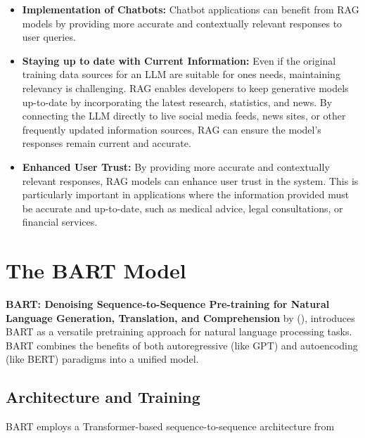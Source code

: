 \begin{itemize}
    \item \textbf{Implementation of Chatbots:} Chatbot applications can benefit from RAG models by providing more accurate and contextually relevant responses to user queries. 
    \item \textbf{Staying up to date with Current Information:} Even if the original training data sources for an LLM are suitable for ones needs, maintaining relevancy is challenging. RAG enables developers to keep generative models up-to-date by incorporating the latest research, statistics, and news. By connecting the LLM directly to live social media feeds, news sites, or other frequently updated information sources, RAG can ensure the model's responses remain current and accurate.
    \item \textbf{Enhanced User Trust:} By providing more accurate and contextually relevant responses, RAG models can enhance user trust in the system. This is particularly important in applications where the information provided must be accurate and up-to-date, such as medical advice, legal consultations, or financial services.
\end{itemize}

\section{The BART Model}\label{sec:bart}
    \textbf{BART: Denoising Sequence-to-Sequence Pre-training for Natural Language Generation, Translation, and Comprehension} by (\cite{lewis2019bart}), introduces BART as a versatile pretraining approach for natural language processing tasks. BART combines the benefits of both autoregressive (like GPT) and autoencoding (like BERT) paradigms into a unified model.

    \subsection{Architecture and Training}
    BART employs a Transformer-based sequence-to-sequence architecture from 
    
